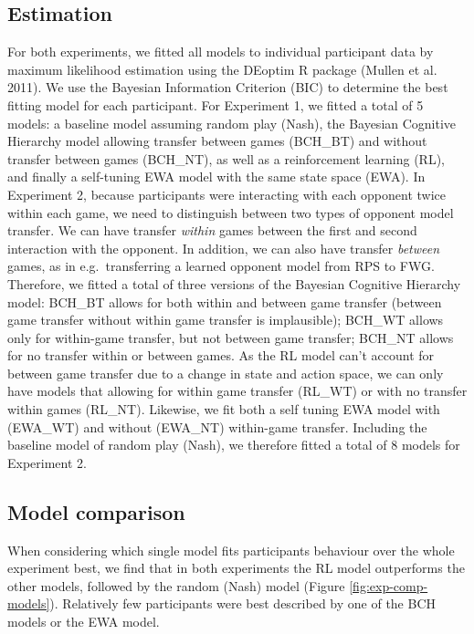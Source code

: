\documentclass[smallextended]{svjour3}       %
\begin{document}
\hypertarget{estimation}{%
\subsection{Estimation}\label{estimation}}

For both experiments, we fitted all models to individual participant
data by maximum likelihood estimation using the DEoptim R package
(Mullen et al. 2011). We use the Bayesian Information Criterion (BIC) to
determine the best fitting model for each participant. For Experiment 1,
we fitted a total of 5 models: a baseline model assuming random play
(Nash), the Bayesian Cognitive Hierarchy model allowing transfer between
games (BCH\_BT) and without transfer between games (BCH\_NT), as well as
a reinforcement learning (RL), and finally a self-tuning EWA model with
the same state space (EWA). In Experiment 2, because participants were
interacting with each opponent twice within each game, we need to
distinguish between two types of opponent model transfer. We can have
transfer \emph{within} games between the first and second interaction
with the opponent. In addition, we can also have transfer \emph{between}
games, as in e.g.~transferring a learned opponent model from RPS to FWG.
Therefore, we fitted a total of three versions of the Bayesian Cognitive
Hierarchy model: BCH\_BT allows for both within and between game
transfer (between game transfer without within game transfer is
implausible); BCH\_WT allows only for within-game transfer, but not
between game transfer; BCH\_NT allows for no transfer within or between
games. As the RL model can't account for between game transfer due to a
change in state and action space, we can only have models that allowing
for within game transfer (RL\_WT) or with no transfer within games
(RL\_NT). Likewise, we fit both a self tuning EWA model with (EWA\_WT)
and without (EWA\_NT) within-game transfer. Including the baseline model
of random play (Nash), we therefore fitted a total of 8 models for
Experiment 2.

\hypertarget{model-comparison}{%
\subsection{Model comparison}\label{model-comparison}}

When considering which single model fits participants behaviour over the
whole experiment best, we find that in both experiments the RL model
outperforms the other models, followed by the random (Nash) model
(Figure \ref{fig:exp-comp-models}). Relatively few participants were
best described by one of the BCH models or the EWA model.
\end{document}
